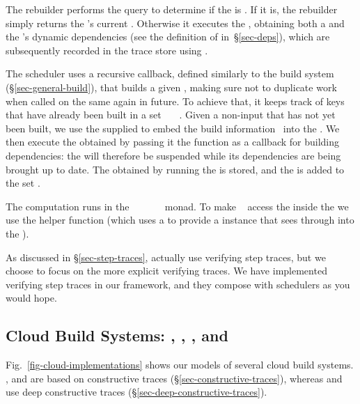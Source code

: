 The rebuilder performs the  query to determine if the  is
. If it is, the rebuilder simply returns the 's current
. Otherwise it executes the , obtaining both a 
and the 's dynamic dependencies  (see the definition of
 in~\S\ref{sec-deps}), which are subsequently recorded in the trace
store using .

The  scheduler uses a recursive  callback, defined
similarly to the  build system (\S\ref{sec-general-build}), that builds
a given , making sure not to duplicate work when called on the same
 again in future. To achieve that, it keeps track of keys that have
already been built in a set ~\hs{::}~~. Given a non-input
 that has not yet been built, we use the supplied  to
embed the build information~ into the . We then execute the
obtained  by passing it the  function as a callback for
building dependencies: the  will therefore be suspended while its
dependencies are being brought up to date. The  obtained by running
the  is stored, and the  is added to the set .

The  computation runs in the
~~~~~~ monad. To make
~ access the  inside the  we use the helper
function  (which uses a  to provide a 
instance that sees through into the ).

As discussed in \S\ref{sec-step-traces}, \Shake actually use verifying step traces, but we
choose to focus on the more explicit verifying traces. We have implemented
verifying step traces in our framework, and they compose with schedulers as
you would hope.

\subsection{Cloud Build Systems: \Bazel, \CloudBuild, \Cloud \Shake, \Buck and \Nix}
\label{sec-implementation-cloud}

Fig.~\ref{fig-cloud-implementations} shows our models of several cloud build
systems. \Bazel, \CloudBuild and \Cloud \Shake are based on constructive traces
(\S\ref{sec-constructive-traces}), whereas \Buck and \Nix use deep
constructive traces (\S\ref{sec-deep-constructive-traces}).

